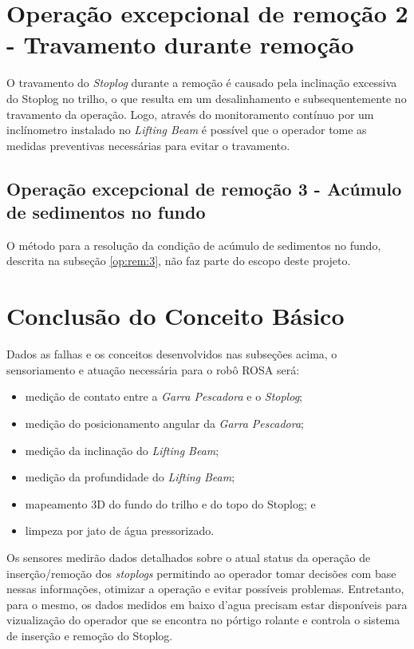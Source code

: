 
\section{Operação excepcional de remoção 2 - Travamento durante remoção}

O travamento do \emph{Stoplog} durante a remoção é causado pela inclinação excessiva do Stoplog no trilho, o que resulta em um desalinhamento e subsequentemente no travamento da operação. Logo, através do monitoramento contínuo por um inclínometro instalado no \emph{Lifting Beam} é possível que o operador tome as medidas preventivas necessárias para evitar o travamento.   


\subsection{Operação excepcional de remoção 3 - Acúmulo de sedimentos no fundo}
O método para a resolução da condição de acúmulo de sedimentos no fundo,
descrita na subseção \ref{op:rem:3}, não faz parte do escopo deste projeto.



\section{Conclusão do Conceito Básico}

Dados as falhas e os conceitos desenvolvidos nas subseções acima, o
sensoriamento e atuação necessária para o robô ROSA será:

\begin{itemize}

	\item medição de contato entre a \emph{Garra Pescadora} e o \emph{Stoplog}; 
	\item medição do posicionamento angular da \emph{Garra Pescadora}; 
	\item medição da inclinação do \emph{Lifting Beam};
	\item medição da profundidade do \emph{Lifting Beam}; 
	\item mapeamento 3D do fundo do trilho e do topo do Stoplog; e
	\item limpeza por jato de água pressorizado. 

\end{itemize}

Os sensores medirão dados detalhados sobre o atual status da
operação de inserção/remoção dos \emph{stoplogs} permitindo ao operador tomar decisões
com base nessas informações, otimizar a operação e evitar possíveis problemas.
Entretanto, para o mesmo, os dados medidos em baixo d'agua precisam estar
disponíveis para vizualização do operador que se encontra no pórtigo rolante e controla o sistema de inserção e remoção do Stoplog.

